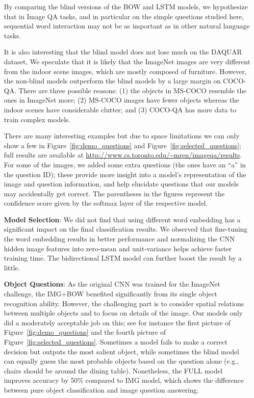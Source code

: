 \documentclass{article} \usepackage{nips15submit_e,times}
\renewcommand{\#}[1]{\textbf{#1}}
\begin{document}
By comparing the blind versions of the BOW and LSTM models, we hypothesize
that in Image QA tasks, and in particular on the simple questions studied here,
sequential word interaction may not be as important as in other natural
language tasks. 

It is also interesting that the blind model does not lose much on the DAQUAR
dataset, We speculate that it is likely that the ImageNet images are very
different from the indoor scene images, which are mostly composed of furniture.
However, the non-blind models outperform the blind models by a large margin on
COCO-QA. There are three possible reasons: (1) the objects in MS-COCO
resemble the ones in ImageNet more; (2) MS-COCO images have fewer objects
whereas the indoor scenes have considerable clutter; and (3) COCO-QA has more
data to train complex models.

There are many interesting examples but due to space limitations we can only
show a few in Figure~\ref{fig:demo_questions} and
Figure~\ref{fig:selected_questions}; full results are available at
\url{http://www.cs.toronto.edu/~mren/imageqa/results}.  For some of the
images, we added some extra questions (the ones have an ``a'' in the
question ID); these provide more insight into a model's representation of the
image and question information, and help elucidate questions that our models
may accidentally get correct. The parentheses in the figures represent the
confidence score given by the softmax layer of the respective model.

\textbf{Model Selection}: We did not find that using different word embedding
has a significant impact on the final classification results. We observed that
fine-tuning the word embedding results in better performance and normalizing
the CNN hidden image features into zero-mean and unit-variance helps achieve
faster training time. The bidirectional LSTM model can further boost the result
by a little.
 
\textbf{Object Questions}: As the original CNN was trained for the ImageNet
challenge, the IMG+BOW benefited significantly from its single object recognition
ability. However, the challenging part is to consider spatial relations between
multiple objects and to focus on details of the image. Our models only did a
moderately acceptable job on this; see for instance the first picture of
Figure~\ref{fig:demo_questions} and the fourth picture of
Figure~\ref{fig:selected_questions}. Sometimes a model fails to make a correct
decision but outputs the most salient object, while sometimes the blind model
can equally guess the most probable objects based on the question alone (e.g.,
chairs should be around the dining table). Nonetheless, the FULL model improves
accuracy by 50\% compared to IMG model, which shows the difference between pure
object classification and image question answering.
\end{document}
